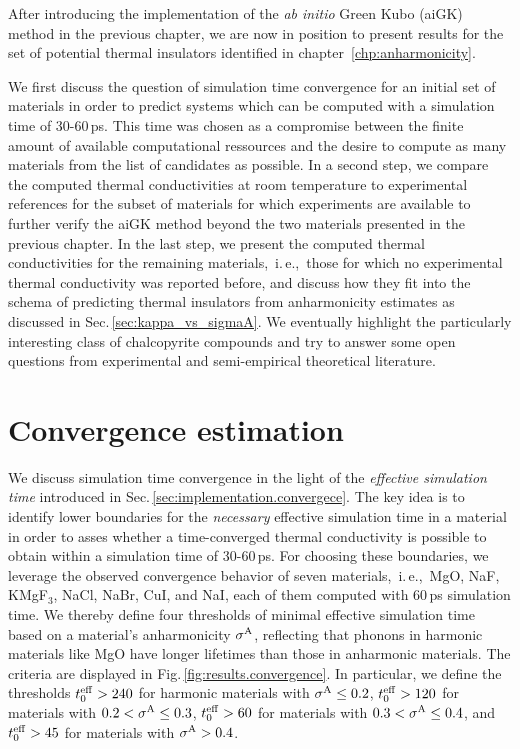 \label{chp:results}

After introducing the implementation of the \emph{ab initio} Green Kubo (aiGK) method in the previous chapter, we are now in position to present results for the set of potential thermal insulators identified in chapter~\ref{chp:anharmonicity}.

We first discuss the question of simulation time convergence for an initial set of materials in order to predict systems which can be computed with a simulation time of 30-60\,ps. This time was chosen as a compromise between the finite amount of available computational ressources and the desire to compute as many materials from the list of candidates as possible.
%
In a second step, we compare the computed thermal conductivities at room temperature to experimental references for the subset of materials for which experiments are available to further verify the aiGK method beyond the two materials presented in the previous chapter.
%
In the last step, we present the computed thermal conductivities for the remaining materials,~i.\,e.,~those for which no experimental thermal conductivity was reported before, and discuss how they fit into the schema of predicting thermal insulators from anharmonicity estimates as discussed in Sec.\,\ref{sec:kappa_vs_sigmaA}. We eventually highlight the particularly interesting class of chalcopyrite compounds and try to answer some open questions from experimental and semi-empirical theoretical literature.




\section{Convergence estimation}
We discuss simulation time convergence in the light of the \emph{effective simulation time} introduced in Sec.\,\ref{sec:implementation.convergece}. The key idea is to identify lower boundaries for the \emph{necessary} effective simulation time in a material in order to asses whether a time-converged thermal conductivity is possible to obtain within a simulation time of 30-60\,ps. For choosing these boundaries, we leverage the observed convergence behavior of seven materials,~i.\,e.,~MgO, NaF, KMgF$_3$, NaCl, NaBr, CuI, and NaI, each of them computed with 60\,ps simulation time. We thereby define four thresholds of minimal effective simulation time based on a material's anharmonicity $\sigma^\mathrm{A}$, reflecting that phonons in harmonic materials like MgO have longer lifetimes than those in anharmonic materials. The criteria are displayed in Fig.\,\ref{fig:results.convergence}. In particular, we define the thresholds $t^{\rm eff}_0 > 240$ for harmonic materials with $\sigma^\mathrm{A} \leq 0.2$, $t^{\rm eff}_0 > 120$ for materials with $0.2 < \sigma^\mathrm{A} \leq 0.3$, $t^{\rm eff}_0 > 60$ for materials with $0.3 < \sigma^\mathrm{A} \leq 0.4$, and $t^{\rm eff}_0 > 45$ for materials with $\sigma^\mathrm{A} > 0.4$.

